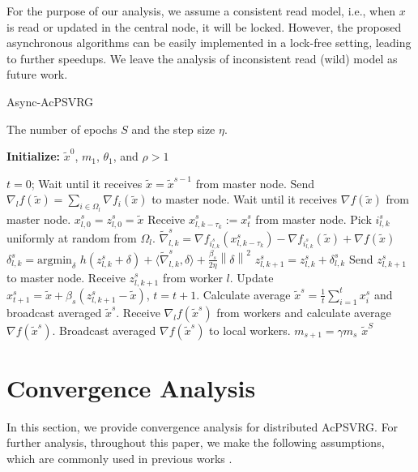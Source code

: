 \documentclass[letterpaper]{article} %
\newcommand{\norm}[1]{\left\lVert#1\right\rVert}
\renewcommand{\algorithmicrequire}{
\textbf{Input:}}
\renewcommand{\algorithmicensure}{\textbf{Output:}}
\begin{document}
For the purpose of our analysis, we assume a consistent read model, i.e., when $x$ is read or updated in the central node, it will be locked. However, the proposed asynchronous algorithms can be easily implemented in a lock-free setting, leading to further speedups. We leave the analysis of inconsistent read (wild) model as future work.
\begin{algorithm}[H]
\caption{Async-AcPSVRG}\label{AsyncVR-Algo}
\begin{algorithmic}
\renewcommand{\algorithmicrequire}{\textbf{Input:}}
 \renewcommand{\algorithmicensure}{\textbf{Output:}}
  \newcommand{\INITIALIZE}{\item[\textbf{Initialize:}]}
\REQUIRE The number of epochs $S$ and the step size $\eta$.
\INITIALIZE  $\widetilde{x}^0$, $m_1$, $\theta_1$, and $\rho > 1$

\STATE $t=0$;
\STATE Wait until it receives $\widetilde{x} = \widetilde{x}^{s-1}$ from master node.
\STATE  Send $\nabla_l f(\widetilde{x}) = \sum_{i\in\Omega_l}\nabla f_i(\widetilde{x})$ to master node.
\STATE  Wait until it receives $\nabla f(\widetilde{x})$ from master node.
\STATE $x_{l,0}^s = z_{l,0}^s = \widetilde{x}$
 \STATE Receive $x_{l,k-\tau_k}^s:=x_{t}^s$ from master node.
 \STATE Pick $i_{l,k}^s$ uniformly at random from $\Omega_l$.
 \STATE $\widetilde{\nabla}_{l,k}^s = \nabla f_{i_{l,k}^s}(x_{l,k-\tau_k}^s) - \nabla f_{i_{l,k}^s}(\widetilde{x}) + \nabla f(\widetilde{x})$
 \STATE $\delta_{l,k}^s = \text{argmin}_{\delta}\,\,h(z_{l,k}^s+\delta)+\langle\widetilde{\nabla}_{l,k}^s,\delta\rangle + \frac{{\beta_s}}{2\eta}\norm{\delta}^2$
 \STATE $z_{l,k+1}^s = z_{l,k}^s + \delta_{l,k}^s$
 \STATE Send $z_{l,k+1}^s$ to master node.
 \STATE Receive $z_{l,k+1}^s$ from worker $l$. 
  \STATE Update $x^s_{t+1} = \widetilde{x}+\beta_s(z_{l,k+1}^s-\widetilde{x})$, $t=t+1$.
  \ENDFOR
   \STATE Calculate average $\widetilde{x}^s = \frac{1}{t}\sum_{i=1}^{t} x_{i}^s$ and broadcast averaged $\widetilde{x}^s$. 
  \STATE Receive $\nabla_l f(\widetilde{x}^s)$ from workers and calculate average $\nabla f(\widetilde{x}^s)$.
  \STATE Broadcast averaged $\nabla f(\widetilde{x}^s)$ to local workers.
  \STATE $m_{s+1} = \gamma m_s$
  \ENDFOR
 \ENSURE $\widetilde{x}^S$
\end{algorithmic}
\end{algorithm}

\section{Convergence Analysis}
In this section, we provide convergence analysis for distributed AcPSVRG. For further analysis, throughout this paper, we make the following assumptions, which are commonly used in previous works \cite{Reddi2015,Meng2016}.
\end{document}
